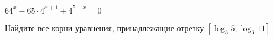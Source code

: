 \begin{ex}[type=equation]
	\begin{condition}
		\begin{enumcols}[label=\asbuk*)]
			\item \( 64^x - 65\cdot 4^{x+1} +4^{5-x}  = 0 \)
			\item Найдите все корни уравнения, принадлежащие отрезку \(  \left[\log_3 5;\log_3 11\right] \)
		\end{enumcols}
	\end{condition}
\end{ex}